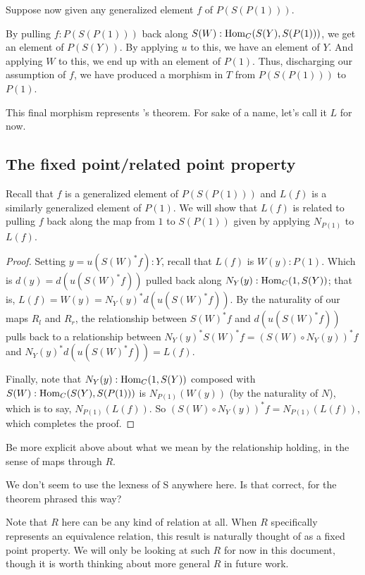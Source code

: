 Suppose now given any generalized element $f$ of $P(S(P(1)))$.

By pulling $f :P(S(P(1)))$ back along $S(W) : \operatorname{Hom}_C(S(Y), S(P(1)))$, we get an element of $P(S(Y))$. By applying $u$ to this, we have an element of $Y$. And applying $W$ to this, we end up with an element of $P(1)$. Thus, discharging our assumption of $f$, we have produced a morphism in $T$ from $P(S(P(1)))$ to $P(1)$.

This final morphism represents \Loeb's theorem. For sake of a name, let's call it $L$ for now.

\subsection{The fixed point/related point property}
Recall that $f$ is a generalized element of $P(S(P(1)))$ and $L(f)$ is a similarly generalized element of $P(1)$. We will show that $L(f)$ is related to pulling $f$ back along the map from $1$ to $S(P(1))$ given by applying $N_{P(1)}$ to $L(f)$.
\begin{proof}
Setting $y = u(S(W)^* f) : Y$, recall that $L(f)$ is $W(y) : P(1)$. Which is $d(y) = d(u(S(W)^* f))$ pulled back along $N_Y(y) : \operatorname{Hom}_C(1, S(Y))$; that is, $L(f) = W(y) = N_Y(y)^* d(u(S(W)^* f))$. By the naturality of our maps $R_l$ and $R_r$, the relationship between $S(W)^*f$ and $d(u(S(W)^*f))$ pulls back to a relationship between $N_Y(y)^* S(W)^*f = (S(W) \circ N_Y(y))^* f$ and $N_Y(y)^* d(u(S(W)^*f)) = L(f)$.

Finally, note that $N_Y(y) : \operatorname{Hom}_C(1, S(Y))$ composed with $S(W) : \operatorname{Hom}_C(S(Y), S(P(1)))$ is $N_{P(1)}(W(y))$ (by the naturality of $N$), which is to say, $N_{P(1)}(L(f))$. So $(S(W) \circ N_Y(y))^* f = N_{P(1)}(L(f))$, which completes the proof.
\end{proof}

\begin{TODOblock}
Be more explicit above about what we mean by the relationship holding, in the sense of maps through $R$.
\end{TODOblock}

\begin{TODOblock}
We don't seem to use the lexness of S anywhere here. Is that correct, for the theorem phrased this way?
\end{TODOblock}

Note that $R$ here can be any kind of relation at all. When $R$ specifically represents an equivalence relation, this result is naturally thought of as a fixed point property. We will only be looking at such $R$ for now in this document, though it is worth thinking about more general $R$ in future work.

